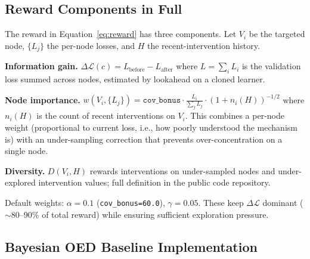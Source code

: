 \subsection{Reward Components in Full}
\label{app:reward}

The reward in Equation~\eqref{eq:reward} has three components. Let $V_i$ be the targeted node, $\{L_j\}$ the per-node losses, and $H$ the recent-intervention history.

\textbf{Information gain.} $\Delta\mathcal{L}(c) = L_\text{before} - L_\text{after}$ where $L = \sum_i L_i$ is the validation loss summed across nodes, estimated by lookahead on a cloned learner.

\textbf{Node importance.} $w(V_i, \{L_j\}) = \texttt{cov\_bonus} \cdot \tfrac{L_i}{\sum_j L_j} \cdot (1 + n_i(H))^{-1/2}$ where $n_i(H)$ is the count of recent interventions on $V_i$. This combines a per-node weight (proportional to current loss, i.e., how poorly understood the mechanism is) with an under-sampling correction that prevents over-concentration on a single node.

\textbf{Diversity.} $D(V_i, H)$ rewards interventions on under-sampled nodes and under-explored intervention values; full definition in the public code repository.

Default weights: $\alpha = 0.1$ (\texttt{cov\_bonus=60.0}), $\gamma = 0.05$. These keep $\Delta\mathcal{L}$ dominant ($\sim$80--90\% of total reward) while ensuring sufficient exploration pressure.

\subsection{Bayesian OED Baseline Implementation}
\label{app:boed-impl}


